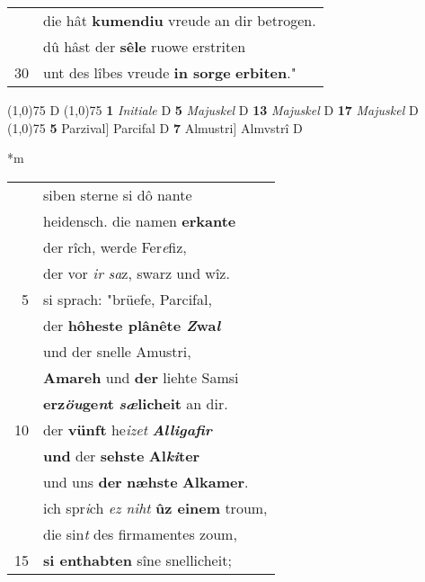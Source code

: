 \documentclass[8pt,a4paper,notitlepage]{article}
\begin{document}
\begin{table}[ht]
\begin{minipage}[t]{0.5\linewidth}
\begin{tabular}{rl}
 & die hât \textbf{kumendiu} vreude an dir betrogen.\\ 
 & dû hâst der \textbf{sêle} ruowe erstriten\\ 
30 & unt des lîbes vreude \textbf{in sorge} \textbf{erbiten}."\\ 
\end{tabular}
\scriptsize
\line(1,0){75} \newline
D \newline
\line(1,0){75} \newline
\textbf{1} \textit{Initiale} D  \textbf{5} \textit{Majuskel} D  \textbf{13} \textit{Majuskel} D  \textbf{17} \textit{Majuskel} D  \newline
\line(1,0){75} \newline
\textbf{5} Parzival] Parcifal D \textbf{7} Almustri] Almvstrî D \newline
\end{minipage}
\hspace{0.5cm}
\begin{minipage}[t]{0.5\linewidth}
\small
\begin{center}*m
\end{center}
\begin{tabular}{rl}
 & siben sterne si dô nante\\ 
 & heidensch. die namen \textbf{erkante}\\ 
 & der rîch, werde Fer\textit{e}fiz,\\ 
 & der vor \textit{ir sa}z, swarz und wîz.\\ 
5 & si sprach: "brüefe, Parcifal,\\ 
 & der \textbf{hôheste plânête \textit{Z}wa\textit{l}}\\ 
 & und der snelle Amustri,\\ 
 & \textbf{Amareh} und \textbf{der} liehte Samsi\\ 
 & \textbf{erz\textit{öu}ge\textit{n}t} \textbf{\textit{sæ}licheit} an dir.\\ 
10 & der \textbf{vünft} he\textit{izet} \textit{\textbf{Alligafir}}\\ 
 & \textbf{und} der \textbf{sehste} \textbf{Al\textit{ki}ter}\\ 
 & und uns \textbf{der} \textbf{næhste} \textbf{Alkamer}.\\ 
 & ich spr\textit{i}ch \textit{ez niht} \textbf{ûz einem} troum,\\ 
 & die sin\textit{t} des firmamentes zoum,\\ 
15 & \textbf{si enthabten} sîne snellicheit;\\ 

\end{tabular}
\end{minipage}
\end{table}
\end{document}
